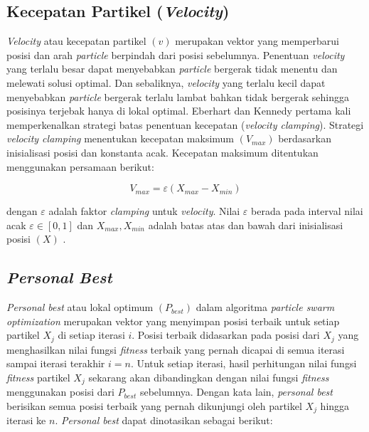 {\subsection{Kecepatan Partikel (\textit{Velocity})}
{\frenchspacing
\textit{Velocity} atau kecepatan partikel $(v)$ merupakan vektor yang memperbarui posisi dan arah \textit{particle} berpindah dari posisi sebelumnya.
Penentuan \textit{velocity} yang terlalu besar dapat menyebabkan \textit{particle} bergerak tidak menentu dan melewati solusi optimal.
Dan sebaliknya, \textit{velocity} yang terlalu kecil dapat menyebabkan \textit{particle} bergerak terlalu lambat bahkan tidak bergerak sehingga
posisinya terjebak hanya di lokal optimal. Eberhart dan Kennedy pertama kali memperkenalkan strategi batas penentuan kecepatan (\textit{velocity clamping}).
Strategi \textit{velocity clamping} menentukan kecepatan maksimum $(V_{max})$ berdasarkan inisialisasi posisi dan konstanta acak.
Kecepatan maksimum ditentukan menggunakan persamaan berikut:

\begin{equation}
    V_{max} = \varepsilon (X_{max}-X_{min})
    \label{pers: velocity clamping}
\end{equation}

\hspace{-0.675cm}dengan $\varepsilon$ adalah faktor \textit{clamping} untuk \textit{velocity}. Nilai $\varepsilon$ berada pada interval nilai acak $\varepsilon \in [0,1]$ dan $X_{max},X_{min}$ adalah batas atas dan bawah dari inisialisasi posisi $(X)$ .
}

\vspace{-5mm}
\subsection{\textit{Personal Best}}
{\frenchspacing
    \textit{Personal best} atau lokal optimum $(P_{best})$ dalam algoritma \textit{particle swarm optimization} merupakan vektor yang menyimpan posisi terbaik untuk setiap partikel $X_{j}$ di setiap iterasi $i$.
    Posisi terbaik didasarkan pada posisi dari $X_{j}$ yang menghasilkan nilai fungsi \textit{fitness} terbaik yang pernah dicapai di semua iterasi sampai iterasi terakhir $i=n$.
    Untuk setiap iterasi, hasil perhitungan nilai fungsi \textit{fitness} partikel $X_{j}$ sekarang akan dibandingkan dengan nilai fungsi \textit{fitness} menggunakan posisi dari $P_{best}$ sebelumnya.
    Dengan kata lain, \textit{personal best} berisikan semua posisi terbaik yang pernah dikunjungi oleh partikel $X_{j}$ hingga iterasi ke $n$.
    \textit{Personal best} dapat dinotasikan sebagai berikut:

}}

